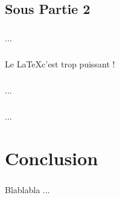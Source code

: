 \documentclass[a4paper,french,10pt]{memoir}
\begin{document}
\section{Sous Partie 2}
\paragraph{}
...
\paragraph{}
Le \LaTeX c'est trop puissant !
\paragraph{}
...
\paragraph{}
...
 
 
\backmatter %
\chapter{Conclusion}
\paragraph{}
Blablabla ...
\listoffigures %
\appendix %
\end{document}
